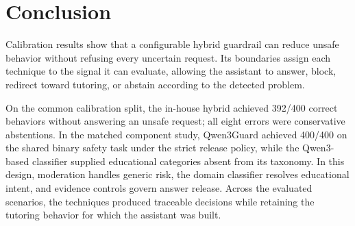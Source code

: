 \documentclass[conference,a4paper]{IEEEtran}
\begin{document}
\section{Conclusion}

Calibration results show that a configurable hybrid guardrail can reduce unsafe behavior without refusing every uncertain request. Its boundaries assign each technique to the signal it can evaluate, allowing the assistant to answer, block, redirect toward tutoring, or abstain according to the detected problem.

On the common calibration split, the in-house hybrid achieved 392/400 correct behaviors without answering an unsafe request; all eight errors were conservative abstentions. In the matched component study, Qwen3Guard achieved 400/400 on the shared binary safety task under the strict release policy, while the Qwen3-based classifier supplied educational categories absent from its taxonomy. In this design, moderation handles generic risk, the domain classifier resolves educational intent, and evidence controls govern answer release. Across the evaluated scenarios, the techniques produced traceable decisions while retaining the tutoring behavior for which the assistant was built.

\balance


\end{document}
